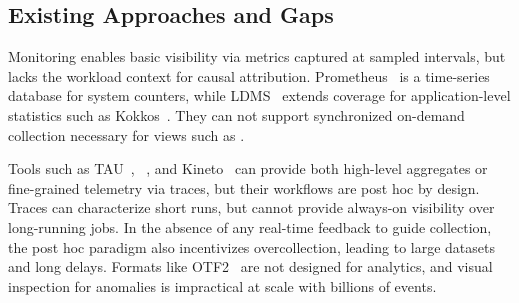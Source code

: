 
\subsection{Existing Approaches and Gaps}\label{sec:orca:bg:existing}

Monitoring enables basic visibility via metrics captured at sampled intervals, but lacks the
workload context for causal attribution.
Prometheus~\cite{:Prometheus} is a time-series database for system counters, while
LDMS~\cite{Schwa2021:LDMS} extends coverage for application-level statistics such as
Kokkos~\cite{Trott2022:Kokkos3}.
They can not support synchronized on-demand collection necessary for views such as
.

Tools such as TAU~\cite{Shend2006:TAU}, \scorep{}~\cite{Knupf2012:Score-P}, and
Kineto~\cite{2025:PytorchKineto} can provide both high-level aggregates or fine-grained telemetry
via traces, but their workflows are post hoc by design.
Traces can characterize short runs, but cannot provide always-on visibility over long-running jobs.
In the absence of any real-time feedback to guide collection, the post hoc paradigm also
incentivizes overcollection, leading to large datasets and long delays.
Formats like OTF2~\cite{Eschw2012:OTF2} are not designed for analytics, and visual inspection for
anomalies is impractical at scale with billions of events.

